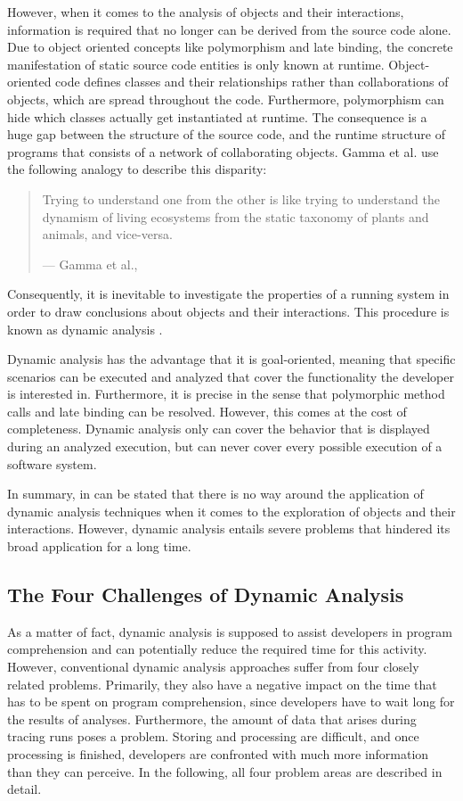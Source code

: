 However, when it comes to the analysis of objects and their interactions, information is required that no longer can be derived from the source code alone.
Due to object oriented concepts like polymorphism and late binding, the concrete manifestation of static source code entities is only known at runtime.
Object-oriented code defines classes and their relationships rather than collaborations of objects, which are spread throughout the code.
Furthermore, polymorphism can hide which classes actually get instantiated at runtime.
The consequence is a huge gap between the structure of the source code, and the runtime structure of programs that consists of a network of collaborating objects.
Gamma et al. use the following analogy to describe this disparity:

\begin{quote}
Trying to understand one from the other is like trying to understand the dynamism of living ecosystems from the static taxonomy of plants and animals, and vice-versa.
\par\raggedleft--- \textup{Gamma et al.}, \cite{gamma_design_1995}
\end{quote}

Consequently, it is inevitable to investigate the properties of a running system in order to draw conclusions about objects and their interactions.
This procedure is known as dynamic analysis \cite{bell_concept_1999}.

Dynamic analysis has the advantage that it is goal-oriented, meaning that specific scenarios can be executed and analyzed that cover the functionality the developer is interested in.
Furthermore, it is precise in the sense that polymorphic method calls and late binding can be resolved.
However, this comes at the cost of completeness.
Dynamic analysis only can cover the behavior that is displayed during an analyzed execution, but can never cover every possible execution of a software system.

In summary, in can be stated that there is no way around the application of dynamic analysis techniques when it comes to the exploration of objects and their interactions.
However, dynamic analysis entails severe problems that hindered its broad application for a long time.

\subsection{The Four Challenges of Dynamic Analysis}
\label{ss:BackgroundAnalysisProblems}
As a matter of fact, dynamic analysis is supposed to assist developers in program comprehension and can potentially reduce the required time for this activity.
However, conventional dynamic analysis approaches suffer from four closely related problems.
Primarily, they also have a negative impact on the time that has to be spent on program comprehension, since developers have to wait long for the results of analyses.
Furthermore, the amount of data that arises during tracing runs poses a problem. 
Storing and processing are difficult, and once processing is finished, developers are confronted with much more information than they can perceive.
In the following, all four problem areas are described in detail.

